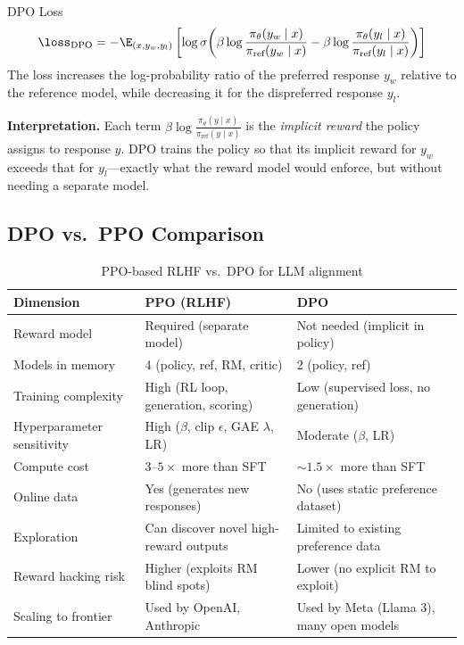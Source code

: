 \begin{mathresult}{DPO Loss}
\begin{equation}
\loss_{\text{DPO}} = -\E_{(x, y_w, y_l)}\left[\log \sigma\!\left(\beta \log \frac{\pi_\theta(y_w \mid x)}{\pi_{\text{ref}}(y_w \mid x)} - \beta \log \frac{\pi_\theta(y_l \mid x)}{\pi_{\text{ref}}(y_l \mid x)}\right)\right]
\end{equation}
The loss increases the log-probability ratio of the preferred response $y_w$ relative to the reference model, while decreasing it for the dispreferred response $y_l$.
\end{mathresult}

\textbf{Interpretation.} Each term $\beta \log \frac{\pi_\theta(y \mid x)}{\pi_{\text{ref}}(y \mid x)}$ is the \textit{implicit reward} the policy assigns to response $y$. DPO trains the policy so that its implicit reward for $y_w$ exceeds that for $y_l$---exactly what the reward model would enforce, but without needing a separate model.

\subsection{DPO vs.\ PPO Comparison}

\begin{table}[H]
\centering
\caption{PPO-based RLHF vs.\ DPO for LLM alignment}
\begin{tabularx}{\textwidth}{lXX}
\toprule
\textbf{Dimension} & \textbf{PPO (RLHF)} & \textbf{DPO} \\
\midrule
Reward model & Required (separate model) & Not needed (implicit in policy) \\
Models in memory & 4 (policy, ref, RM, critic) & 2 (policy, ref) \\
Training complexity & High (RL loop, generation, scoring) & Low (supervised loss, no generation) \\
Hyperparameter sensitivity & High ($\beta$, clip $\epsilon$, GAE $\lambda$, LR) & Moderate ($\beta$, LR) \\
Compute cost & $3$--$5\times$ more than SFT & $\sim 1.5\times$ more than SFT \\
Online data & Yes (generates new responses) & No (uses static preference dataset) \\
Exploration & Can discover novel high-reward outputs & Limited to existing preference data \\
Reward hacking risk & Higher (exploits RM blind spots) & Lower (no explicit RM to exploit) \\
Scaling to frontier & Used by OpenAI, Anthropic & Used by Meta (Llama 3), many open models \\
\bottomrule
\end{tabularx}
\end{table}

